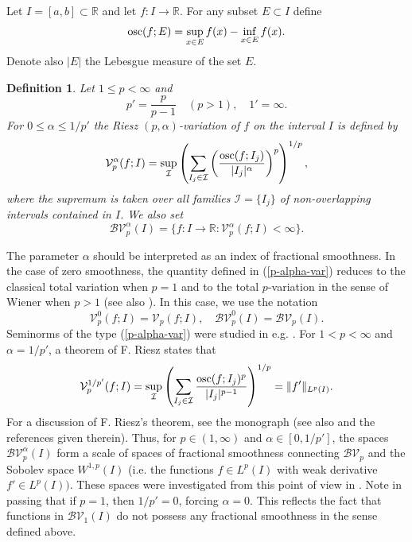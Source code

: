 \documentclass{amsart}
\newtheorem{defn}[theorem]{Definition}
\numberwithin{equation}{section}
\begin{document}
Let $I=[a,b]\subset\mathbb{R}$ and let $f:I\rightarrow\mathbb{R}$. For any subset $E\subset I$ define
\begin{equation}
    \nonumber
    {\rm osc}(f;E)=\sup_{x\in E}f(x)-\inf_{x\in E}f(x).
\end{equation}
Denote also $|E|$ the Lebesgue measure of the set $E$.
\begin{defn}
    Let $1\le p<\infty$ and 
    \begin{equation}
        \nonumber
        p'=\frac{p}{p-1}\quad(p>1),\quad 1'=\infty.
    \end{equation}
    For $0\le\alpha\le1/p'$  the \emph{Riesz $(p,\alpha)$-variation} of $f$ on the interval $I$ is defined by
    \begin{equation}
        \label{p-alpha-var}
        \mathcal{V}_p^\alpha(f;I)=\sup_\mathcal{I}\left(\sum_{I_j\in\mathcal{I}}\left(\frac{{\rm osc}(f;I_j)}{|I_j|^{\alpha}}\right)^p\right)^{1/p},
    \end{equation}  
    where the supremum is taken over all families $\mathcal{I}=\{I_j\}$ of non-overlapping intervals contained in $I$. We also set
    \begin{equation}
        \nonumber
        \mathcal{BV}_p^\alpha(I)=\{f:I\rightarrow\mathbb{R}:\mathcal{V}_p^\alpha(f;I)<\infty\}.
    \end{equation}
\end{defn}
The parameter $\alpha$ should be interpreted as an index of fractional smoothness. In the case of zero smoothness, the quantity defined in (\ref{p-alpha-var}) reduces to the classical total variation when $p=1$ and to the total $p$-variation in the sense of Wiener \cite{Wi24} when $p>1$ (see also \cite{Yo36}). In this case, we use the notation
\begin{equation}
    \nonumber
    \mathcal{V}_p^0(f;I)=\mathcal{V}_p(f;I),\quad\mathcal{BV}_p^0(I)=\mathcal{BV}_p(I).
\end{equation}
Seminorms of the type (\ref{p-alpha-var}) were studied in e.g. \cite{KoLi09,Li13}.
For $1<p<\infty$ and $\alpha=1/p'$, a theorem of F. Riesz states that 
\begin{equation}
    \nonumber
    \mathcal{V}_p^{1/p'}(f;I)=\sup_{\mathcal{I}}\left(\sum_{I_j\in\mathcal{I}}\frac{{\rm osc}(f;I_j)^p}{|I_j|^{p-1}}\right)^{1/p}=\|f'\|_{L^p(I)}.
\end{equation}
For a discussion of F. Riesz's theorem, see the monograph \cite[Section 3.5]{ApBaMe14} (see also \cite{BaLi15} and the references given therein). Thus, for $p\in(1,\infty)$ and $\alpha\in[0,1/p']$, the spaces $\mathcal{BV}_p^\alpha(I)$ form a scale of spaces of fractional smoothness connecting $\mathcal{BV}_p$ and the Sobolev space $W^{1,p}(I)$ (i.e. the functions $f\in L^p(I)$ with weak derivative $f'\in L^p(I))$. These spaces were investigated from this point of view in \cite{Li13}.
Note in passing that if $p=1$, then $1/p'=0$, forcing $\alpha=0$. This reflects the fact that functions in $\mathcal{BV}_1(I)$ do not possess any fractional smoothness in the sense defined above.
\end{document}
